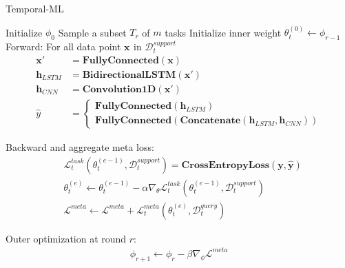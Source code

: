 \begin{algorithm}[H]
    \caption{Temporal-ML} \label{alg:maml}
    \begin{algorithmic}[1]
        \State Initialize $\phi_0$
         
            \State Sample a subset $T_r$ of $m$ tasks
             
                \State Initialize inner weight $\theta_t^{(0)} \leftarrow \phi_{r-1}$
                \State Forward: For all data point $\mathbf{x}_{}$ in $\mathcal{D}_t^{support}$
                \begin{align*}
                    \mathbf{x'} &= \mathbf{FullyConnected}\left( \mathbf{x} \right)\\
                    \mathbf{h}_{LSTM} &= \mathbf{BidirectionalLSTM}\left( \mathbf{x'} \right)\\
                    \mathbf{h}_{CNN} &= \mathbf{Convolution1D}\left( \mathbf{x'} \right)\\
                    \hat{y} &= \begin{cases}
                        \mathbf{FullyConnected}\left( \mathbf{h}_{LSTM} \right)\\
                        \mathbf{FullyConnected}\left( \mathbf{Concatenate}\left( \mathbf{h}_{LSTM}, \mathbf{h}_{CNN} \right)\right)
                    \end{cases}
                \end{align*}

                \State Backward and aggregate meta loss:
                \begin{align*}
                    &\mathcal{L}_t^{task}\left( \theta_t^{(e-1)}, \mathcal{D}_t^{support} \right) = \mathbf{CrossEntropyLoss}\left( \mathbf{y}, \hat{\mathbf{y}} \right)\\
                    &\theta_t^{(e)} \leftarrow \theta_t^{(e-1)} - \alpha\nabla_\theta\mathcal{L}_t^{task}\left( \theta_t^{(e-1)}, \mathcal{D}_t^{support} \right)\\
                    &\mathcal{L}^{meta} \leftarrow \mathcal{L}^{meta} + \mathcal{L}_t^{meta}\left( \theta_t^{(e)}, \mathcal{D}_t^{query} \right)
                \end{align*}
            \EndFor

            \State Outer optimization at round $r$:
            \begin{align*}
                \phi_{r+1} \leftarrow \phi_r - \beta\nabla_\phi\mathcal{L}^{meta}
            \end{align*}
        \EndFor
    \end{algorithmic}
\end{algorithm}

